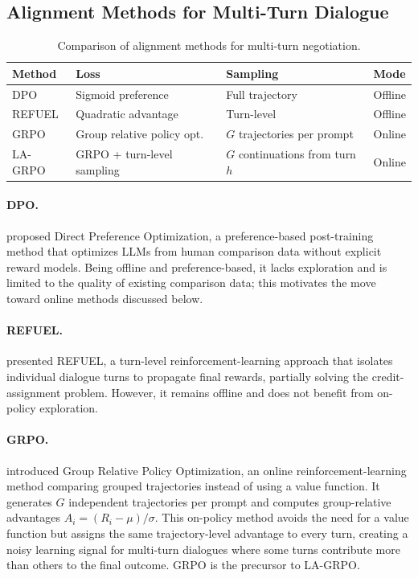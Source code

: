 \documentclass[12pt,a4paper]{article}
\begin{document}
\subsection{Alignment Methods for Multi-Turn Dialogue}

\begin{table}[H]
\centering
\caption{Comparison of alignment methods for multi-turn negotiation.}
\label{tab:alignment_methods}
\begin{tabular}{llll}
\toprule
\textbf{Method} & \textbf{Loss} & \textbf{Sampling} & \textbf{Mode} \\
\midrule
DPO & Sigmoid preference & Full trajectory & Offline \\
REFUEL & Quadratic advantage & Turn-level & Offline \\
GRPO & Group relative policy opt. & $G$ trajectories per prompt & Online \\
LA-GRPO & GRPO + turn-level sampling & $G$ continuations from turn $h$ & Online \\
\bottomrule
\end{tabular}
\end{table}

\paragraph{DPO.} \citet{rafailov2023direct} proposed Direct Preference Optimization, a preference-based post-training method that optimizes LLMs from human comparison data without explicit reward models. Being offline and preference-based, it lacks exploration and is limited to the quality of existing comparison data; this motivates the move toward online methods discussed below.

\paragraph{REFUEL.} \citet{gao2024regressing} presented REFUEL, a turn-level reinforcement-learning approach that isolates individual dialogue turns to propagate final rewards, partially solving the credit-assignment problem. However, it remains offline and does not benefit from on-policy exploration.

\paragraph{GRPO.} \citet{shao2024deepseekmathpushinglimitsmathematical} introduced Group Relative Policy Optimization, an online reinforcement-learning method comparing grouped trajectories instead of using a value function. It generates $G$ independent trajectories per prompt and computes group-relative advantages $A_i = (R_i - \mu) / \sigma$. This on-policy method avoids the need for a value function but assigns the same trajectory-level advantage to every turn, creating a noisy learning signal for multi-turn dialogues where some turns contribute more than others to the final outcome. GRPO is the precursor to LA-GRPO.
\end{document}
